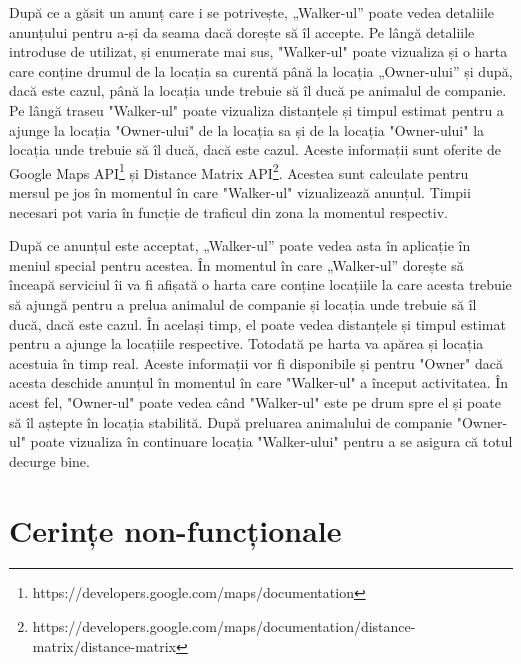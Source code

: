 După ce a găsit un anunț care i se potrivește, „Walker-ul” poate vedea detaliile anunțului pentru a-și da seama dacă dorește să îl accepte. Pe lângă detaliile introduse de utilizat, și enumerate mai sus, "Walker-ul" poate vizualiza și o harta care conține drumul de la locația sa curentă până la locația „Owner-ului” și după, dacă este cazul, până la locația unde trebuie să îl ducă pe animalul de companie. Pe lângă traseu "Walker-ul" poate vizualiza distanțele și timpul estimat pentru a ajunge la locația "Owner-ului" de la locația sa și de la locația "Owner-ului" la locația unde trebuie să îl ducă, dacă este cazul. Aceste informații sunt oferite de Google Maps API\footnote{https://developers.google.com/maps/documentation} și Distance Matrix API\footnote{https://developers.google.com/maps/documentation/distance-matrix/distance-matrix}. Acestea sunt calculate pentru mersul pe jos în momentul în care "Walker-ul" vizualizează anunțul. Timpii necesari pot varia în funcție de traficul din zona la momentul respectiv.


După ce anunțul este acceptat, „Walker-ul” poate vedea asta în aplicație în meniul special pentru acestea. În momentul în care „Walker-ul” dorește să înceapă serviciul îi va fi afișată o harta care conține locațiile la care acesta trebuie să ajungă pentru a prelua animalul de companie și locația unde trebuie să îl ducă, dacă este cazul. În același timp, el poate vedea distanțele și timpul estimat pentru a ajunge la locațiile respective. Totodată pe harta va apărea și locația acestuia în timp real. Aceste informații vor fi disponibile și pentru "Owner" dacă acesta deschide anunțul în momentul în care "Walker-ul" a început activitatea. În acest fel, "Owner-ul" poate vedea când "Walker-ul" este pe drum spre el și poate să îl aștepte în locația stabilită. După preluarea animalului de companie "Owner-ul" poate vizualiza în continuare locația "Walker-ului" pentru a se asigura că totul decurge bine.



\section{Cerințe non-funcționale}

